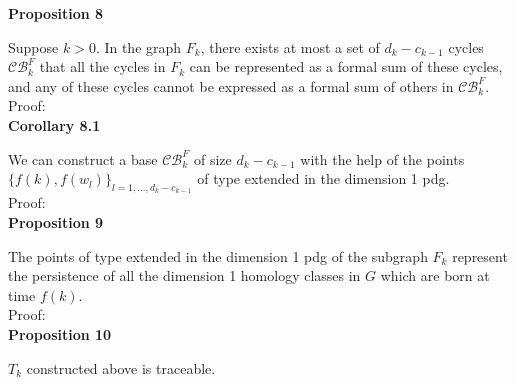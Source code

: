 \documentclass[a4paper,12pt]{article}
\numberwithin{equation}{section}
\begin{document}
	\noindent \textbf{Proposition 8}
	
	Suppose $k>0$. In the graph $F_k$, there exists at most a set of $d_k - c_{k-1}$ cycles $\mathcal{CB}^{F}_k$ that all the cycles in $F_k$ can be represented as a formal sum of these cycles, and any of these cycles cannot be expressed as a formal sum of others in $\mathcal{CB}^F_k$.\\
	
	\noindent Proof:\\
	
	\noindent \textbf{Corollary 8.1}
	
	We can construct a base $\mathcal{CB}^F_k$ of size $d_k - c_{k-1}$ with the help of the points $\{f(k), f(w_l)\}_{l =1,\ldots,d_k - c_{k-1}}$ of type extended in the dimension 1 pdg.\\
	
	\noindent Proof: \\
	
	\noindent \textbf{Proposition 9}
	
	The points of type extended in the dimension 1 pdg of the subgraph $F_k$ represent the persistence of all the dimension 1 homology classes in $G$ which are born at time $f(k)$. \\
	
	\noindent Proof:\\
	
	
	
	\noindent \textbf{Proposition 10}
	
	$T_k$ constructed above is traceable.
	
	
	
	
	


	
\end{document}
